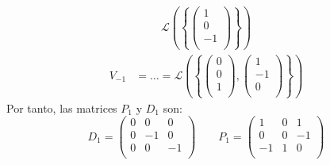 \begin{ejercicio}
\begin{enumerate}
\begin{itemize}
\begin{equation*}
\begin{split}
               \mathcal{L}\left(\left\{ \left(\begin{array}{c}
                    1 \\
                    0 \\
                    -1 \\
               \end{array}\right)
               \right\}\right)
           \end{split}\end{equation*}
           \begin{equation*}\begin{split}
            V_{-1} & = \dots =
               \mathcal{L}\left(\left\{ \left(\begin{array}{c}
                    0 \\
                    0 \\
                    1 \\
               \end{array}\right),
               \left(\begin{array}{c}
                    1 \\
                    -1 \\
                    0 \\
               \end{array}\right)
               \right\}\right)
           \end{split}\end{equation*}
           Por tanto, las matrices $P_{1}$ y $D_{1}$ son:
            \begin{equation*}
                D_{1} = \left( \begin{array}{ccc}
                    0 & 0 & 0 \\
                    0 & -1 & 0 \\
                    0 & 0 & -1 \\
                \end{array}\right) \qquad 
                P_{1} = \left( \begin{array}{ccc}
                    1 & 0 & 1 \\
                    0 & 0 & -1 \\
                    -1& 1 & 0 \\
                \end{array}\right)
            \end{equation*}


\end{itemize}
\end{enumerate}
\end{ejercicio}
